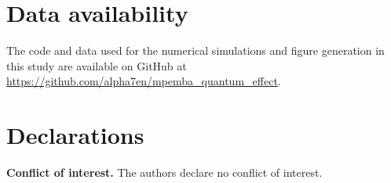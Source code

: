 \documentclass[pdflatex,sn-mathphys-num]{sn-jnl}
\begin{document}
\section*{Data availability}

The code and data used for the numerical simulations and figure generation in this study are available on GitHub at \url{https://github.com/alpha7en/mpemba_quantum_effect}.

\section*{Declarations}
\textbf{Conflict of interest.} The authors declare no conflict of interest.


\end{document}
